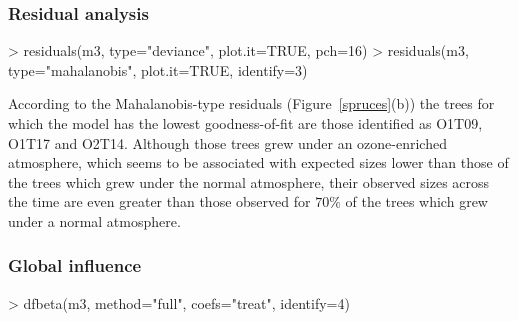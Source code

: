
\subsubsection{Residual analysis}
\begin{example}
> residuals(m3, type="deviance", plot.it=TRUE, pch=16)
> residuals(m3, type="mahalanobis", plot.it=TRUE, identify=3)
\end{example}

According to the Mahalanobis-type residuals (Figure~\ref{spruces}(b)) the trees for which the model has the lowest goodness-of-fit are those identified as O1T09, O1T17 and O2T14. Although those trees grew under an ozone-enriched atmosphere, which seems to be associated with expected sizes lower than those of the trees which grew under the normal atmosphere, their observed sizes across the time are even greater than those observed for $70\%$ of the trees which grew under a normal atmosphere.

\subsubsection{Global influence}
\begin{example}
> dfbeta(m3, method="full", coefs="treat", identify=4)
\end{example}


